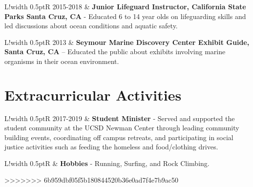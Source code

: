 \documentclass[10pt]{article}
\newcommand\VRule{\color{lightgray}\vrule width 0.5pt}
\begin{document}
\begin{tabular}{L!{\VRule}R}
2015-2018 & \textbf{Junior Lifeguard Instructor, California State Parks Santa Cruz, CA } - Educated 6 to 14 year olds on lifeguarding skills and led discussions about ocean conditions and aquatic safety. \\[5pt]
\end{tabular}
\newline \noindent
\newline \noindent 
\newline \noindent
\begin{tabular}{L!{\VRule}R}
2013 & \textbf{Seymour Marine Discovery Center Exhibit Guide, Santa Cruz, CA} -- Educated the public about exhibits involving marine organisms in their ocean environment.\\[5pt] 
\end{tabular}

\vspace{.3cm}
\section*{Extracurricular Activities}
\vspace{.3cm}
\begin{tabular}{L!{\VRule}R}
2017-2019 & \textbf{Student Minister} - Served and supported the student community at the UCSD Newman Center through leading community building events, coordinating off campus retreats, and participating in social justice activities such as feeding the homeless and food/clothing drives.  \\[5pt]
\end{tabular} 
\newline \noindent
\newline \noindent 
\newline \noindent
\begin{tabular}{L!{\VRule}R}
& \textbf{Hobbies} - Running, Surfing, and Rock Climbing.  \\[5pt]
\end{tabular}

\vspace{.3cm}
>>>>>>> 6b959dbf05f5b180844520b36e0ad7f4e7b9ac50
\end{document}
